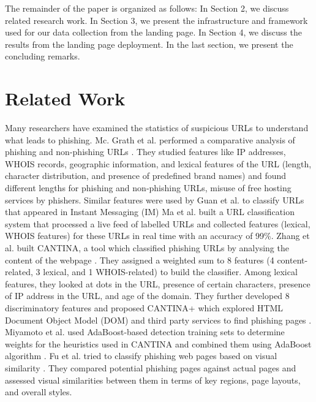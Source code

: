 \documentclass[conference]{IEEEtran}
\begin{document}
The remainder of the paper is organized as follows: In Section 2, we discuss related research work. In Section 3, we present the infrastructure and framework used for our data collection from the landing page. In Section 4, we discuss the results from the landing page deployment. In the last section, we present the concluding remarks.

\section{Related Work}
Many researchers have examined the statistics of suspicious URLs to understand what leads to phishing.  Mc. Grath et al. performed a comparative analysis of phishing and non-phishing URLs \cite{mcgrath}. They studied features like IP addresses, WHOIS records, geographic information, and lexical features of the URL (length, character distribution, and presence of predefined brand names) and found different lengths for phishing and non-phishing URLs, misuse of free hosting services by phishers. Similar features were used by Guan et al. to classify URLs that appeared in Instant Messaging (IM) \cite{guan} Ma et al. built a URL classiﬁcation system that processed a live feed of labelled URLs and collected features (lexical, WHOIS features) for these URLs in real time \cite{ma} with an accuracy of 99\%. Zhang et al. built CANTINA, a tool which classified phishing URLs by analysing the content of the webpage \cite{zhang}. They assigned a weighted sum to 8 features (4 content-related, 3 lexical, and 1 WHOIS-related) to build the classifier. Among lexical features, they looked at dots in the URL, presence of certain characters, presence of IP address in the URL, and age of the domain. They further developed 8 discriminatory features and proposed CANTINA+ which explored HTML Document Object Model (DOM) and third party services to find phishing pages \cite{cantinaplus}. Miyamoto et al. used AdaBoost-based detection training sets to determine weights for the heuristics used in CANTINA and combined them using AdaBoost algorithm \cite{miyamoto}. Fu et al. tried to classify phishing web pages based on visual similarity \cite{yu}. They compared potential phishing pages against actual pages and assessed visual similarities between them in terms of key regions, page layouts, and overall styles.
\newline\indent
\end{document}
